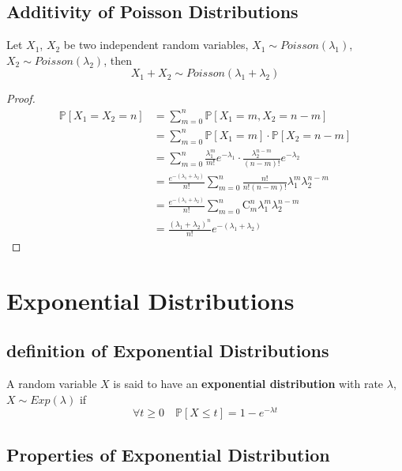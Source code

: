     \subsection{Additivity of Poisson Distributions}
    \begin{theorem}
        Let $X_1$, $X_2$ be two independent random variables, $X_1\sim Poisson(\lambda_1)$, $X_2\sim Poisson(\lambda_2)$, then
        \[ X_1 + X_2 \sim Poisson(\lambda_1 + \lambda_2) \]
    \end{theorem}
    \begin{proof}
        \begin{align*}
            \mathbb{P}[X_1=X_2=n] &=\sum_{m=0}^n \mathbb{P}[X_1=m, X_2=n-m]\\
            &= \sum_{m=0}^n\mathbb{P}[X_1=m]\cdot\mathbb{P}[X_2=n-m]\\
            &= \sum_{m=0}^n\frac{\lambda_1^m}{m!}e^{-\lambda_1}\cdot\frac{\lambda_2^{n-m}}{(n-m)!}e^{-\lambda_2}\\
            &= \frac{e^{-(\lambda_1+\lambda_2)}}{n!}\sum_{m=0}^n\frac{n!}{n!(n-m)!}\lambda_1^m\lambda_2^{n-m}\\
            &= \frac{e^{-(\lambda_1+\lambda_2)}}{n!}\sum_{m=0}^n\mathrm{C}_m^n \lambda_1^m \lambda_2^{n-m}\\
            &= \frac{(\lambda_1+\lambda_2)^n}{n!}e^{-(\lambda_1+\lambda_2)}
        \end{align*}
    \end{proof}


\section{Exponential Distributions}

    \subsection{definition of Exponential Distributions}
    \begin{definition}
        A random variable $X$ is said to have an \textbf{exponential distribution} with rate $\lambda$, $X \sim Exp(\lambda)$ if
        \[ \forall t \ge 0 \quad \mathbb{P}[X \le t] = 1 - e^{-\lambda t} \]
    \end{definition}

    \subsection{Properties of Exponential Distribution}

